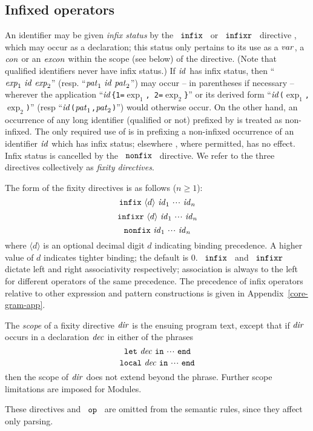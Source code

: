 \subsection{Infixed operators}
An identifier may be given {\sl infix status} by the
~${\tt infix}$~ or ~${\tt infixr}$~ directive , which may occur as a
declaration; this status only pertains to its use as a ${\it var}$, a
${\it con}$ or an ${\it excon}$ within the scope (see below) of the directive.
(Note that qualified identifiers never have infix status.)  If ${\it id}$
has infix status, then ``${\it exp}_1\ {\it id}\ {\it exp}_2$'' (resp. ``${\it pat}_1\
{\it id}\ {\it pat}_2$'') may occur -- in parentheses if necessary -- wherever
the application ``${\it id}$\verb+{+{\tt 1=}$\exp_1$\verb+,+{\tt
2=}$\exp_2$\verb+}+'' or its derived form
``${\it id}$\verb+(+$\exp_1$\verb+,+$\exp_2$\verb+)+'' (resp
``${\it id}$\verb+(+${\it pat}_1$\verb+,+${\it pat}_2$\verb+)+'') would otherwise
occur.  On the other hand, an occurrence of any long identifier (qualified
or not) prefixed by {\OP} is treated as non-infixed. The only required
use of {\OP} is in prefixing a non-infixed occurrence of an
identifier ${\it id}$ which has infix status; elsewhere {\OP}, where
permitted, has no effect.
Infix status is cancelled by the ~${\tt nonfix}$~
directive.  We refer to the three directives collectively as {\sl
fixity directives}.

The form of the fixity directives is as follows ($n\geq 1$):
\[ \mbox{${\tt infix}\ \langle d\rangle\ {\it id}_1\ \mbox{$\cdot\!\cdot\!\cdot$}\ {\it id}_n$} \]
\[ \mbox{${\tt infixr}\ \langle d\rangle\ {\it id}_1\ \mbox{$\cdot\!\cdot\!\cdot$}\ {\it id}_n$} \]
\[ \mbox{${\tt nonfix}\ {\it id}_1\ \mbox{$\cdot\!\cdot\!\cdot$}\ {\it id}_n$} \]
where $\langle d\rangle$ is an optional decimal digit $d$ indicating
binding precedence. A higher value of $d$ indicates tighter binding;
the default is $0$.  ~${\tt infix}$~ and ~${\tt infixr}$~ dictate left and right
associativity respectively; association is always to the left for different
operators of the same precedence.  The precedence of infix operators relative
to other expression and pattern constructions is given in
Appendix~\ref{core-gram-app}.

The {\sl scope} of a fixity directive ${\it dir}$ is the ensuing program text,
except that if ${\it dir}$ occurs in a declaration ${\it dec}$ in either of the phrases
\[ {\tt let}\ {\it dec}\ {\tt in}\ \mbox{$\cdot\!\cdot\!\cdot$}\ {\tt end} \]
\[ {\tt local}\ {\it dec}\ {\tt in}\ \mbox{$\cdot\!\cdot\!\cdot$}\ {\tt end} \]
then the scope of ${\it dir}$ does not extend beyond the phrase. Further scope
limitations are imposed for Modules.

These directives and ~${\tt op}$~ are omitted from the semantic rules, since they
affect only parsing.


